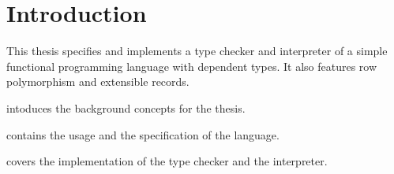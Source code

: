 \chapter{Introduction}\label{ch:introduction}

This thesis specifies and implements a type checker and interpreter of a simple
functional programming language with dependent types. It also features row
polymorphism and extensible records.

 intoduces the background concepts for the thesis.

 contains the usage and the specification of the language.

 covers the implementation of the type checker and the
interpreter.
